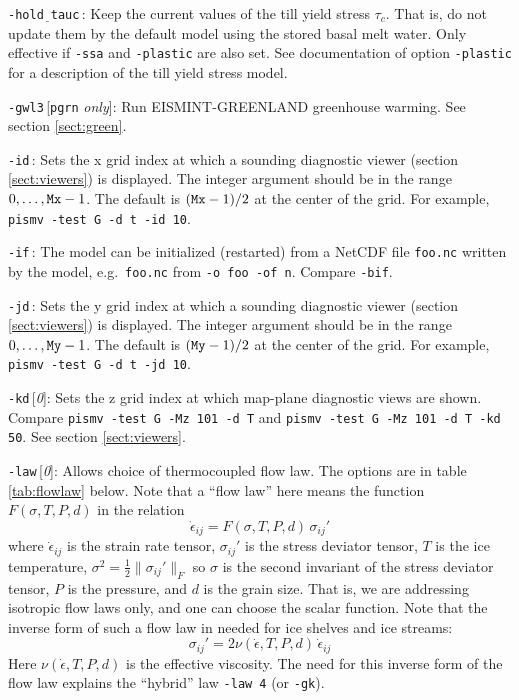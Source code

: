 \documentclass[11pt,final]{amsart}
\renewcommand{\t}[1]{\texttt{#1}}
\newcommand{\eps}{\epsilon}
\newcommand{\rawopt}[1]{\vspace{1mm}\noindent \large\texttt{-#1}\normalsize}
\newcommand{\opt}[1]{\rawopt{#1}\,:\quad}
\newcommand{\optdef}[2]{\rawopt{#1}\,[\textsl{#2}]:\quad}
\newcommand{\optrestrict}[2]{\rawopt{#1}\,[\texttt{#2} \textsl{only}]:\quad}
\newcommand{\und}{$\underline{\,\,\,}$}
\begin{document}
\opt{hold\und tauc}    Keep the current values of the till yield stress $\tau_c$.  That is, do not update them by the default model using the stored basal melt water.  Only effective if \verb|-ssa| and \verb|-plastic| are also set.  See documentation of option \verb|-plastic| for a description of the till yield stress model.

\optrestrict{gwl3}{pgrn}    Run EISMINT-GREENLAND greenhouse warming. See section \ref{sect:green}.

\opt{id}  Sets the x grid index at which a sounding diagnostic viewer (section \ref{sect:viewers}) is displayed.  The integer argument should be in the range $0,\dots,\text{\t{Mx}}-1$.  The default is $(\text{\t{Mx}}-1)/2$ at the center of the grid.  For example, \verb|pismv -test G -d t -id 10|.

\opt{if}  The model can be initialized (restarted) from a NetCDF file \verb|foo.nc| written by the model, e.g.~\verb|foo.nc| from \verb|-o foo -of n|.  Compare \verb|-bif|.

\opt{jd}  Sets the y grid index at which a sounding diagnostic viewer (section \ref{sect:viewers}) is displayed.  The integer argument should be in the range $0,\dots,\text{\t{My}}-1$.  The default is $(\text{\t{My}}-1)/2$ at the center of the grid.  For example, \verb|pismv -test G -d t -jd 10|.

\optdef{kd}{0}  Sets the z grid index at which map-plane diagnostic views are shown.  Compare \verb|pismv -test G -Mz 101 -d T| and \verb|pismv -test G -Mz 101 -d T -kd 50|.  See section \ref{sect:viewers}.

\optdef{law}{0}  Allows choice of thermocoupled flow law.  The options are in table \ref{tab:flowlaw} below.  Note that a ``flow law'' here means the function $F(\sigma,T,P,d)$ in the relation
	$$\dot \eps_{ij} = F(\sigma,T,P,d)\, \sigma_{ij}'$$
where $\dot \eps_{ij}$ is the strain rate tensor, $\sigma_{ij}'$ is the stress deviator tensor, $T$ is the ice temperature, $\sigma^2 = \frac{1}{2} \|\sigma_{ij}'\|_F$ so $\sigma$ is the second invariant of the stress deviator tensor, $P$ is the pressure, and $d$ is the grain size.  That is, we are addressing isotropic flow laws only, and one can choose the scalar function.  Note that the inverse form of such a flow law in needed for ice shelves and ice streams:
	$$\sigma_{ij}' = 2 \nu(\dot\eps,T,P,d)\,\dot \eps_{ij} $$
Here $\nu(\dot \eps,T,P,d)$ is the effective viscosity.  The need for this inverse form of the flow law explains the ``hybrid'' law \verb|-law 4| (or \verb|-gk|).
\end{document}
